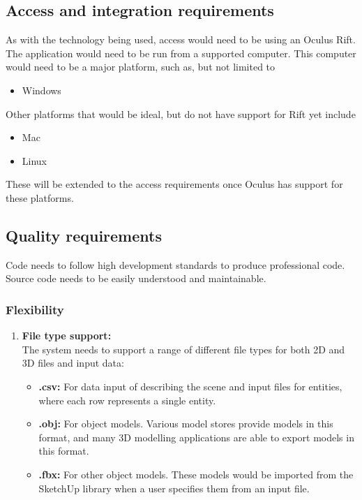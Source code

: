 \documentclass[a4paper,12pt]{article}
\begin{document}
\subsection{Access and integration requirements}
As with the technology being used, access would need to be using an Oculus Rift. \newline\newline The application would need to be run from a supported computer. This computer would need to be a major platform, such as, but not limited to
\begin{itemize}
	\item Windows
\end{itemize}
Other platforms that would be ideal, but do not have support for Rift yet include
\begin{itemize}
	\item Mac
	\item Linux
\end{itemize}
These will be extended to the access requirements once Oculus has support for these platforms.

\subsection{Quality requirements}
Code needs to follow high development standards to produce professional code. Source code needs to be easily understood and maintainable.

\subsubsection{Flexibility}
\begin{enumerate}
	\item \textbf{File type support:}\\
	The system needs to support a range of different file types for both 2D and 3D files and input data:
	\begin{itemize}
		\item \textbf{.csv:} For data input of describing the scene and input files for entities, where each row represents a single entity.
		\item \textbf{.obj:} For object models. Various model stores provide models in this format, and many 3D modelling applications are able to export models in this format.
		\item \textbf{.fbx:} For other object models. These models would be imported from the SketchUp library when a user specifies them from an input file.
	\end{itemize}
\end{enumerate}
\end{document}
